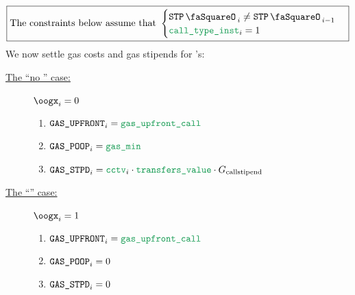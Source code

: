 \[
	\boxed{\text{The constraints below assume that }
	\begin{cases}
		\stpStamp_{i} \neq \stpStamp_{i - 1} \\
		\isCall  _{i} =    1                     \\
	\end{cases}}
\]
We now settle gas costs and gas stipends for 's:
\begin{description}
	\item[\underline{The ``no \oogxSH{}'' case:}] \If $\oogx_{i} = 0$ \Then
		\begin{enumerate}
			\item $\gasUpfront_{i} = \locGasUpfrontCall$
			\item $\gasPoop_{i}    = \locMin$
			\item $\gasStipend_{i} = \cctv_{i} \cdot \locTransfersValue \cdot G_{\text{callstipend}}$
		\end{enumerate}
	\item[\underline{The ``\oogxSH{}'' case:}] \If $\oogx_{i} = 1$ \Then
		\begin{enumerate}
			\item $\gasUpfront_{i} = \locGasUpfrontCall$
			\item $\texttt{GAS}\texttt{\_POOP}_{i}    = 0$
			\item $\texttt{GAS}\texttt{\_STPD}_{i} = 0$
		\end{enumerate}
\end{description}
